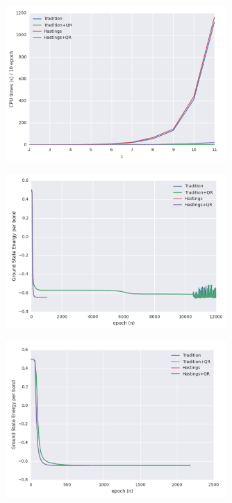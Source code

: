 \begin{figure}[ht]
	\centering
	\includegraphics[width=0.75\textwidth]{figures/fig324.png}
	\caption[CPU times of different 2D-iTEBD with fixed trucation error]{}
	\label{fig324}
\end{figure}

\begin{figure}[ht]
	\centering
	\includegraphics[width=0.75\textwidth]{figures/fig325.png}
	\caption[Per epoch energy of Heisenberg model on 2d square lattice with fixed truncation error]{}
	\label{fig325}
\end{figure}

\begin{figure}[ht]
	\centering
	\includegraphics[width=0.75\textwidth]{figures/fig326.png}
	\caption[CPU times of different 2D-iTEBD with dynamic trucation error]{}
	\label{fig326}
\end{figure}

